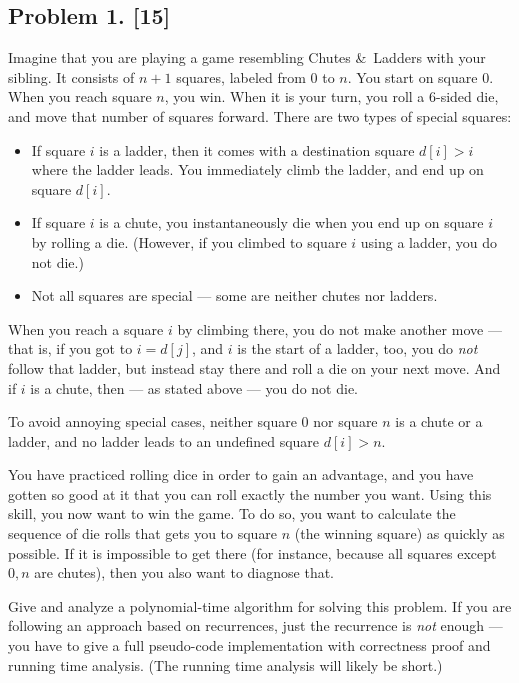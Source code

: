 \documentclass[10pt]{article}
\begin{document}
\newpage

\subsection*{Problem 1. [15]}
  Imagine that you are playing a game resembling Chutes \&\ Ladders with your sibling. It consists of $n+1$ squares, labeled from $0$ to $n$. You start on square 0. When you reach square $n$, you win. When it is your turn, you roll a 6-sided die, and move that number of squares forward. There are two types of special squares:
  \begin{itemize}
    \item If square $i$ is a ladder, then it comes with a destination square $d[i] > i$ where the ladder leads. You immediately climb the ladder, and end up on square $d[i]$.
    \item If square $i$ is a chute, you instantaneously die when you end up on square $i$ by rolling a die. (However, if you climbed to square $i$ using a ladder, you do not die.)
    \item Not all squares are special --- some are neither chutes nor ladders.
  \end{itemize}

  When you reach a square $i$ by climbing there, you do not make another move --- that is, if you got to $i=d[j]$, and $i$ is the start of a ladder, too, you do \emph{not} follow that ladder, but instead stay there and roll a die on your next move. And if $i$ is a chute, then --- as stated above --- you do not die.

  To avoid annoying special cases, neither square $0$ nor square $n$ is a chute or a ladder, and no ladder leads to an undefined square $d[i] > n$.
  
  You have practiced rolling dice in order to gain an advantage, and you have gotten so good at it that you can roll exactly the number you want. Using this skill, you now want to win the game. To do so, you want to calculate the sequence of die rolls that gets you to square $n$ (the winning square) as quickly as possible. If it is impossible to get there (for instance, because all squares except $0, n$ are chutes), then you also want to diagnose that.

  Give and analyze a polynomial-time algorithm for solving this problem. If you are following an approach based on recurrences, just the recurrence is \emph{not} enough --- you have to give a full pseudo-code implementation with correctness proof and running time analysis. (The running time analysis will likely be short.)
\end{document}
